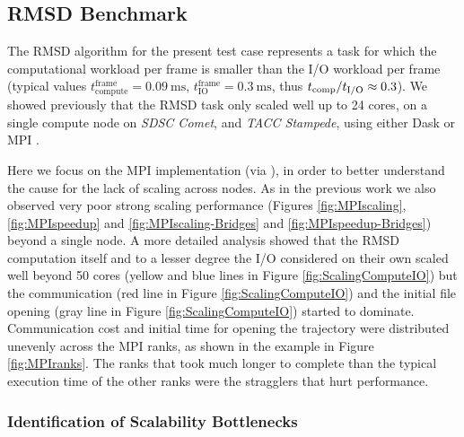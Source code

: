 \label{impl_exp}

\subsection{RMSD Benchmark}
\label{sec:RMSD}
The RMSD algorithm for the present test case represents a task for which the computational workload per frame is smaller than the I/O workload per frame (typical values $t_{\text{compute}}^{\text{frame}} = 0.09\ \text{ms}$, $t_{\text{IO}}^{\text{frame}} = 0.3\ \text{ms}$, thus ${t}_{\text{comp}}/{t}_{\text{I/O}} \approx 0.3$). 
We showed previously that the RMSD task only scaled well up to 24 cores, on a single compute node on \emph{SDSC Comet}, and \emph{TACC Stampede}, using either Dask or MPI \cite{Khoshlessan:2017ab}.

Here we focus on the MPI implementation (via  \cite{Dalcin:2011aa, Dalcin:2005aa}), in order to better understand the cause for the lack of scaling across nodes.
As in the previous work we also observed very poor strong scaling performance (Figures \ref{fig:MPIscaling}, \ref{fig:MPIspeedup} and \ref{fig:MPIscaling-Bridges} and \ref{fig:MPIspeedup-Bridges}) beyond a single node.
A more detailed analysis showed that the RMSD computation itself and to a lesser degree the I/O considered on their own scaled well beyond 50 cores (yellow and blue lines in Figure \ref{fig:ScalingComputeIO}) but the communication (red line in Figure \ref{fig:ScalingComputeIO}) and the initial file opening (gray line in Figure \ref{fig:ScalingComputeIO}) started to dominate.
Communication cost and initial time for opening the trajectory were distributed unevenly across the MPI ranks, as shown in the example in Figure \ref{fig:MPIranks}. 
The ranks that took much longer to complete than the typical execution time of the other ranks were the stragglers that hurt performance.

\subsubsection*{Identification of Scalability Bottlenecks}

